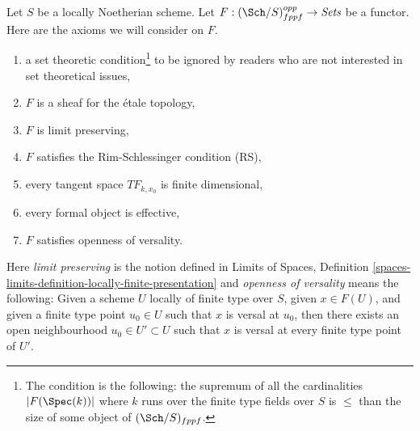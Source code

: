 \medskip\noindent
Let $S$ be a locally Noetherian scheme. Let
$F : (\Sch/S)_{fppf}^{opp} \to \textit{Sets}$ be a functor.
Here are the axioms we will consider on $F$.
\begin{enumerate}
\item[{[-1]}]  a set theoretic condition\footnote{The condition is the
following: the supremum of all the cardinalities
$|F(\Spec(k))|$ where $k$ runs over the finite
type fields over $S$ is $\leq$ than the size of some
object of $(\Sch/S)_{fppf}$.} to be ignored by
readers who are not interested in set theoretical issues,
\item[{[0]}] $F$ is a sheaf for the \'etale topology,
\item[{[1]}] $F$ is limit preserving,
\item[{[2]}] $F$ satisfies the Rim-Schlessinger condition (RS),
\item[{[3]}] every tangent space $TF_{k, x_0}$ is finite dimensional,
\item[{[4]}] every formal object is effective,
\item[{[5]}] $F$ satisfies openness of versality.
\end{enumerate}
Here {\it limit preserving} is the notion defined in
Limits of Spaces, Definition
\ref{spaces-limits-definition-locally-finite-presentation} and
{\it openness of versality} means the following: Given a scheme $U$
locally of finite type over $S$, given $x \in F(U)$, and given
a finite type point $u_0 \in U$ such that $x$ is versal at $u_0$,
then there exists an open neighbourhood $u_0 \in U' \subset U$
such that $x$ is versal at every finite type point of $U'$.






